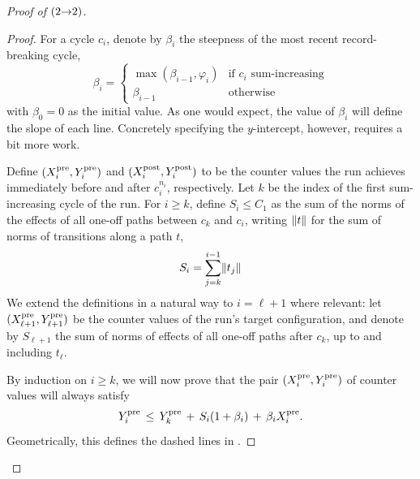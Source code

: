 \begin{proof}[Proof of  $({2}{\rightarrow}{2})$]
\begin{proof}
For a cycle $c_i$, denote by $\beta_i$ the steepness of
the most recent record-breaking cycle, \ie
\[
    \beta_i = \begin{cases}
        \max(\beta_{i-1}, \varphi_i) & \text{if $c_i$ sum-increasing} \\
        \beta_{i-1} & \text{otherwise}
    \end{cases}
\]
with $\beta_0 = 0$ as the initial value.
As one would expect, the value of $\beta_i$ will define the slope of each line.
Concretely specifying the $y$-intercept, however, requires a bit more work.

Define $(X^{\mathrm{pre}}_i, Y^{\mathrm{pre}}_i)$ and $(X^{\mathrm{post}}_i, Y^{\mathrm{post}}_i)$ to be the counter values
the run achieves immediately before and after $c_i^{n_i}$, respectively.
Let $k$ be the index of the first sum-increasing cycle of the run.
For $i \geq k$, define $S_i \leq C_1$ as the sum of the norms of
the effects of all one-off paths between $c_k$ and $c_i$, \ie
writing $\lVert t\rVert$ for the sum of norms of transitions along a path $t$,
\[
    S_i = \sum_{j=k}^{i-1} \lVert t_j\rVert
\]
We extend the definitions in a natural way to $i = \ell + 1$ where relevant:
let $(X^{\mathrm{pre}}_{\ell + 1}, Y^{\mathrm{pre}}_{\ell + 1})$ be the counter values
of the run's target configuration, and denote by $S_{\ell + 1}$
the sum of norms of effects of all one-off paths after $c_k$, up to and
including $t_\ell$.

%

By induction on $i \geq k$, we will now prove that the pair $(X^{\mathrm{pre}}_i,Y^{\mathrm{pre}}_i)$ of
counter values will always satisfy
\begin{equation} \label{eq:steep-ind}
    Y^{\mathrm{pre}}_i \, \leq \, Y^{\mathrm{pre}}_k \, + \, S_i (1 + \beta_i) \, + \, \beta_i X^{\mathrm{pre}}_i.
\end{equation}
Geometrically, this defines the dashed lines in .


\end{proof}
\end{proof}
